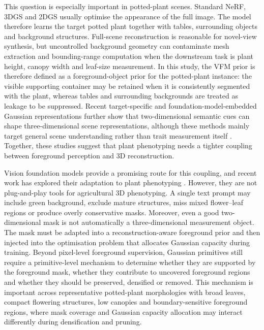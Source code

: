 \documentclass[a4paper]{cas-sc}
\begin{document}
This question is especially important in potted-plant scenes. Standard NeRF, 3DGS and 2DGS usually optimise the appearance of the full image. The model therefore learns the target potted plant together with tables, surrounding objects and background structures. Full-scene reconstruction is reasonable for novel-view synthesis, but uncontrolled background geometry can contaminate mesh extraction and bounding-range computation when the downstream task is plant height, canopy width and leaf-size measurement. In this study, the VFM prior is therefore defined as a foreground-object prior for the potted-plant instance: the visible supporting container may be retained when it is consistently segmented with the plant, whereas tables and surrounding backgrounds are treated as leakage to be suppressed. Recent target-specific and foundation-model-embedded Gaussian representations further show that two-dimensional semantic cues can shape three-dimensional scene representations, although these methods mainly target general scene understanding rather than trait measurement itself \cite{ref68,ref69}. Together, these studies suggest that plant phenotyping needs a tighter coupling between foreground perception and 3D reconstruction.

Vision foundation models provide a promising route for this coupling, and recent work has explored their adaptation to plant phenotyping \cite{ref55}. However, they are not plug-and-play tools for agricultural 3D phenotyping. A single text prompt may include green background, exclude mature structures, miss mixed flower--leaf regions or produce overly conservative masks. Moreover, even a good two-dimensional mask is not automatically a three-dimensional measurement object. The mask must be adapted into a reconstruction-aware foreground prior and then injected into the optimisation problem that allocates Gaussian capacity during training. Beyond pixel-level foreground supervision, Gaussian primitives still require a primitive-level mechanism to determine whether they are supported by the foreground mask, whether they contribute to uncovered foreground regions and whether they should be preserved, densified or removed. This mechanism is important across representative potted-plant morphologies with broad leaves, compact flowering structures, low canopies and boundary-sensitive foreground regions, where mask coverage and Gaussian capacity allocation may interact differently during densification and pruning.
\end{document}
